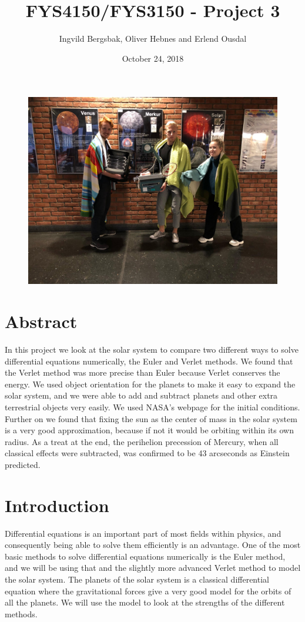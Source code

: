 \documentclass{article}
\begin{document}
\title{\textbf{FYS4150/FYS3150 - Project 3}}
\author{Ingvild Bergsbak, Oliver Hebnes and Erlend Ousdal}
\date{October 24, 2018}




\maketitle
\begin{figure}[H]
  \includegraphics[scale=0.15]{plots/group_pic.jpg}
  \label{}
  \centering
\end{figure}

\newpage
\section{Abstract}
In this project we look at the solar system to compare two different ways to solve differential equations numerically, the Euler and Verlet methods. We found that the Verlet method was more precise than Euler because Verlet conserves the energy. We used object orientation for the planets to make it easy to expand the solar system, and we were able to add and subtract planets and other extra terrestrial objects very easily. We used NASA's webpage \cite{NASA} for the initial conditions. Further on we found that fixing the sun as the center of mass in the solar system is a very good approximation, because if not it would be orbiting within its own radius. As a treat at the end, the perihelion precession of Mercury, when all classical effects were subtracted, was confirmed to be 43 arcseconds as Einstein predicted.


\section{Introduction}
Differential equations is an important part of most fields within physics, and consequently being able to solve them efficiently is an advantage. One of the most basic methods to solve differential equations numerically is the Euler method, and we will be using that and the slightly more advanced Verlet method to model the solar system. The planets of the solar system is a classical differential equation where the gravitational forces give a very good model for the orbits of all the planets. We will use the model to look at the strengths of the different methods.
\end{document}
